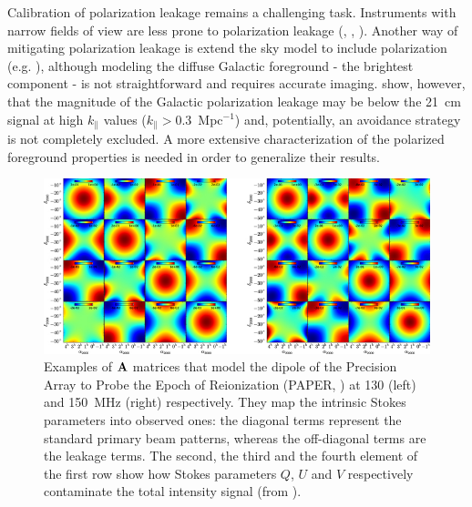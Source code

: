 \begin{itemize}
Calibration of polarization leakage remains a challenging task. Instruments with narrow fields of view are less prone to polarization leakage (\cite{asad15}, \cite{asad16}, \cite{asad18}). Another way of mitigating polarization leakage is extend the sky model to include polarization (e.g. \cite{geil11}), although modeling the diffuse Galactic foreground - the brightest component - is not straightforward and requires accurate imaging. \cite{nunhokee17} show, however, that the magnitude of the Galactic polarization leakage may be below the 21~cm signal at high $k_\parallel$ values ($k_\parallel > 0.3$~Mpc$^{-1}$) and, potentially, an avoidance strategy is not completely excluded. A more extensive characterization of the polarized foreground properties is needed in order to generalize their results.
\begin{figure}[]
\begin{center}
\includegraphics[width=1.\textwidth]{Bernardi/polarized_beam_leakage}
\end{center}
\caption{Examples of ${\bf A}$ matrices that model the dipole of the Precision Array to Probe the Epoch of Reionization (PAPER, \cite{parsons10}) at 130 (left) and 150~MHz (right) respectively. They map the intrinsic Stokes parameters into observed ones: the diagonal terms represent the standard primary beam patterns, whereas the off-diagonal terms are the leakage terms. The second, the third and the fourth element of the first row show how Stokes parameters $Q$, $U$ and $V$ respectively contaminate the total intensity signal (from \cite{nunhokee17}).}
\label{fig:fig4}
\end{figure}




\end{itemize}
